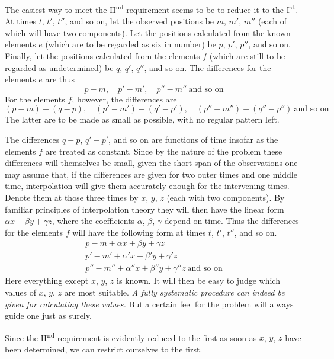%
The easiest way to meet the II\textsuperscript{nd} requirement seems to be to reduce it to the I\textsuperscript{st}. At times $t$, $t'$, $t''$, and so on, let the observed positions be $m$, $m'$, $m''$ (each of which will have two components). Let the positions calculated from the known elements $e$ (which are to be regarded as six in number) be $p$, $p'$, $p''$, and so on. Finally, let the positions calculated from the elements $f$ (which are still to be regarded as undetermined) be $q$, $q'$, $q''$, and so on. The differences for the elements $e$ are thus
\[
p-m,\quad p'-m',\quad p''-m''\ \text{and so on}
\]
For the elements $f$, however, the differences are
\[
(p-m)+(q-p),\quad(p'-m')+(q'-p'),\quad(p''-m'')+(q''-p'')\ \text{and so on}
\]
The latter are to be made as small as possible, with no regular pattern left.

The differences $q-p$, $q'-p'$, and so on are functions of time insofar as the elements $f$ are treated as constant. Since by the nature of the problem these differences will themselves be small, given the short span of the observations one may assume that, if the differences are given for two outer times and one middle time, interpolation will give them accurately enough for the intervening times. Denote them at those three times by $x$, $y$, $z$ (each with two components). By familiar principles of interpolation theory they will then have the linear form $\alpha x+\beta y+\gamma z$, where the coefficients $\alpha$, $\beta$, $\gamma$ depend on time. Thus the differences for the elements $f$ will have the following form at times $t$, $t'$, $t''$, and so on.
\[
\begin{gathered}
p-m+\alpha x+\beta y+\gamma z\\
p'-m'+\alpha'x+\beta'y+\gamma'z\\
p''-m''+\alpha''x+\beta''y+\gamma''z\ \text{and so on}
\end{gathered}
\]
Here everything except $x$, $y$, $z$ is known. It will then be easy to judge which values of $x$, $y$, $z$ are most suitable. \emph{A fully systematic procedure can indeed be given for calculating these values.} But a certain feel for the problem will always guide one just as surely.

Since the II\textsuperscript{nd} requirement is evidently reduced to the first as soon as $x$, $y$, $z$ have been determined, we can restrict ourselves to the first.

